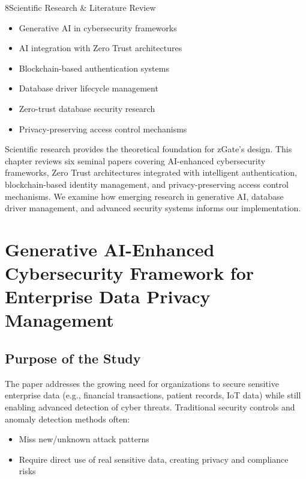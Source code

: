 
\begin{sectionintro}{8}{Scientific Research \& Literature Review}{
  \begin{itemize}[leftmargin=1.5em]
    \item Generative AI in cybersecurity frameworks
    \item AI integration with Zero Trust architectures
    \item Blockchain-based authentication systems
    \item Database driver lifecycle management
    \item Zero-trust database security research
    \item Privacy-preserving access control mechanisms
  \end{itemize}
}
Scientific research provides the theoretical foundation for zGate's design. This chapter reviews six seminal papers covering AI-enhanced cybersecurity frameworks, Zero Trust architectures integrated with intelligent authentication, blockchain-based identity management, and privacy-preserving access control mechanisms. We examine how emerging research in generative AI, database driver management, and advanced security systems informs our implementation.
\end{sectionintro}

\section{Generative AI-Enhanced Cybersecurity Framework for Enterprise Data Privacy Management}

\subsection{Purpose of the Study}

The paper addresses the growing need for organizations to secure sensitive enterprise data (e.g., financial transactions, patient records, IoT data) while still enabling advanced detection of cyber threats. Traditional security controls and anomaly detection methods often:

\begin{itemize}
    \item Miss new/unknown attack patterns
    \item Require direct use of real sensitive data, creating privacy and compliance risks
\end{itemize}

